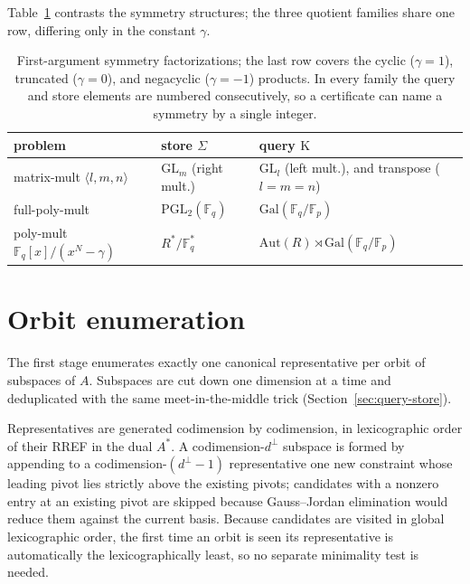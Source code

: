 \documentclass[11pt]{article}
\theoremstyle{definition}
\newcommand{\F}{\mathbb{F}}
\newcommand{\GL}{\mathrm{GL}}
\newcommand{\PGL}{\mathrm{PGL}}
\newcommand{\Gal}{\mathrm{Gal}}
\newcommand{\Aut}{\mathrm{Aut}}
\newcommand{\Kappa}{\mathrm{K}}
\newcommand{\mmt}[3]{\langle #1,#2,#3\rangle}
\begin{document}
\medskip

Table~\ref{tab:symmetry} contrasts the symmetry structures; the three quotient
families share one row, differing only in the constant $\gamma$.

\begin{table}[h]
  \centering
  \setlength{\tabcolsep}{6pt}
  \begin{tabular}{lll}
    \toprule
    problem                            & store $\Sigma$        & query $\Kappa$                                \\
    \midrule
    matrix-mult $\mmt{l}{m}{n}$        & $\GL_m$ (right mult.) & $\GL_l$ (left mult.), and transpose ($l=m=n$) \\
    full-poly-mult                     & $\PGL_2(\F_q)$        & $\Gal(\F_q/\F_p)$                             \\
    poly-mult $\F_q[x]/(x^N{-}\gamma)$ & $R^*/\F_q^*$          & $\Aut(R)\rtimes\Gal(\F_q/\F_p)$               \\
    \bottomrule
  \end{tabular}
  \caption{First-argument symmetry factorizations; the last row covers the cyclic
    ($\gamma=1$), truncated ($\gamma=0$), and negacyclic ($\gamma=-1$) products. In every family the
    query and store elements are numbered consecutively, so a certificate can name
  a symmetry by a single integer.}
  \label{tab:symmetry}
\end{table}

\section{Orbit enumeration}\label{sec:orbits}

The first stage enumerates exactly one canonical representative per orbit of
subspaces of $A$. Subspaces are cut down one dimension at a time
and deduplicated with the same meet-in-the-middle
trick (Section~\ref{sec:query-store}).

Representatives are generated codimension by codimension, in lexicographic
order of their RREF in the dual $A^*$. A codimension-$d^{\perp}$ subspace is formed by
appending to a codimension-$(d^{\perp}-1)$ representative one new constraint whose leading
pivot lies strictly above the existing pivots; candidates with a nonzero
entry at an existing pivot are skipped because Gauss--Jordan elimination would
reduce them against the current basis. Because candidates are visited in global
lexicographic order, the first time an orbit is seen its representative is
automatically the lexicographically least, so no separate minimality test is
needed.
\end{document}
